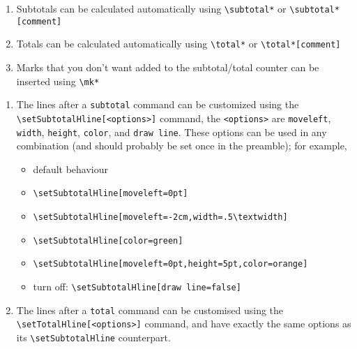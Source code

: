 \documentclass{outn}
\begin{document}
\begin{enumerate}
  \item Subtotals can be calculated automatically using \verb!\subtotal*! 
    or \verb!\subtotal*[comment]!  
  \item Totals can be calculated automatically using  \verb!\total*! 
    or \verb!\total*[comment]! 

\subtotal*
\item Marks that you don't want added to the subtotal/total counter can be inserted using \verb!\mk*! 
\end{enumerate}
\subtotal*

\bigskip
\total*

\begin{enumerate}
  \item The lines after a \verb!subtotal! command can be customized using
    the \verb!\setSubtotalHline[<options>]! command, the \verb!<options>! 
    are \verb!moveleft!, \verb!width!, \verb!height!, \verb!color!, 
    and \verb!draw line!. 
    These options can be used in any combination (and should probably be set once in the preamble); for example, 
    \begin{itemize}
      \item default behaviour

        \subtotal*
      \item \verb!\setSubtotalHline[moveleft=0pt]!
        \setSubtotalHline[moveleft=0pt]

        \subtotal*
      \item \verb!\setSubtotalHline[moveleft=-2cm,width=.5\textwidth]!
        \setSubtotalHline[moveleft=-2cm,width=.5\textwidth]

        \subtotal*
      \item \verb!\setSubtotalHline[color=green]!
        \setSubtotalHline[color=green] 

      \item \verb!\setSubtotalHline[moveleft=0pt,height=5pt,color=orange]!
        \setSubtotalHline[moveleft=0pt,height=5pt,color=orange]

        \subtotal*
      \item turn off: \verb!\setSubtotalHline[draw line=false]! 
            \setSubtotalHline[draw line=false]
        
        \subtotal*
    \end{itemize}
  \item The lines after a \verb!total! command can be customised 
    using the \verb!\setTotalHline[<options>]! command, and have
    exactly the same options as its \verb!\setSubtotalHline! counterpart.


\end{enumerate}
\end{document}
